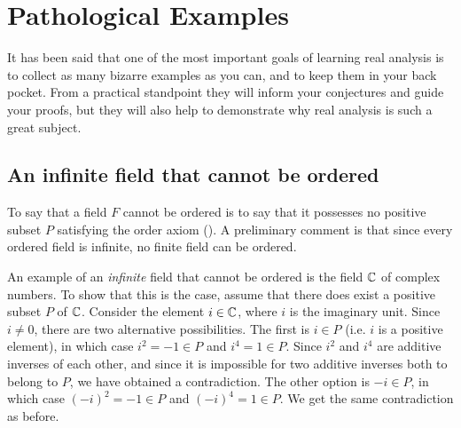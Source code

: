 \documentclass[11pt,twoside=off,numbers=noenddot]{scrbook}
\begin{document}
\appendix

\chapter{Pathological Examples}
It has been said that one of the most important goals of learning
real analysis is to collect as many bizarre examples as you can, and
to keep them in your back pocket. From a practical standpoint they
will inform your conjectures and guide your proofs, but they will
also help to demonstrate why real analysis is such a great subject.

\section{An infinite field that cannot be ordered}
To say that a field $F$ cannot be ordered is to say that it possesses
no positive subset $P$ satisfying the order axiom
(). A preliminary comment is that since every
ordered field is infinite, no finite field can be ordered.

An example of an \textit{infinite} field that cannot be ordered is
the field $\mathbb C$ of complex numbers. To show that this is the case,
assume that there does exist a positive subset $P$ of $\mathbb C$. Consider
the element $i \in \mathbb C$, where $i$ is the imaginary unit. Since $i \neq
0$, there are two alternative possibilities. The first is $i \in P$
(i.e. $i$ is a positive element), in which case $i^2 = -1 \in P$ and
$i^4 = 1 \in P$. Since $i^2$ and $i^4$ are additive inverses of each
other, and since it is impossible for two additive inverses both to
belong to $P$, we have obtained a contradiction. The other option is
$-i \in P$, in which case $(-i)^2 = -1 \in P$ and $(-i)^4 = 1 \in P$.
We get the same contradiction as before.

\printbibliography[nottype=image]
\end{document}
